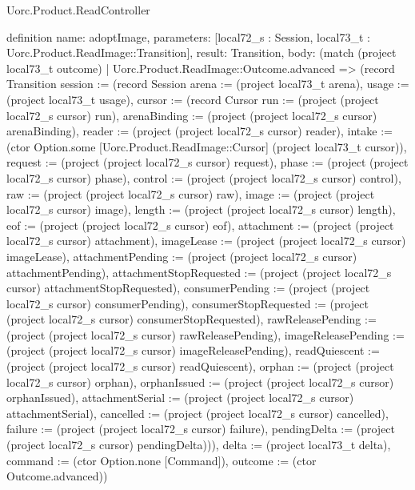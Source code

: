 \begin{lexlean}{Uorc.Product.ReadController}
\begin{semanticmodule}
definition{
  name: adoptImage,
  parameters: [local72_s : Session, local73_t : Uorc.Product.ReadImage::Transition],
  result: Transition,
  body: (match (project local73_t outcome)
    | Uorc.Product.ReadImage::Outcome.advanced => (record Transition {session := (record Session {arena := (project local73_t arena), usage := (project local73_t usage), cursor := (record Cursor {run := (project (project local72_s cursor) run), arenaBinding := (project (project local72_s cursor) arenaBinding), reader := (project (project local72_s cursor) reader), intake := (ctor Option.some [Uorc.Product.ReadImage::Cursor] (project local73_t cursor)), request := (project (project local72_s cursor) request), phase := (project (project local72_s cursor) phase), control := (project (project local72_s cursor) control), raw := (project (project local72_s cursor) raw), image := (project (project local72_s cursor) image), length := (project (project local72_s cursor) length), eof := (project (project local72_s cursor) eof), attachment := (project (project local72_s cursor) attachment), imageLease := (project (project local72_s cursor) imageLease), attachmentPending := (project (project local72_s cursor) attachmentPending), attachmentStopRequested := (project (project local72_s cursor) attachmentStopRequested), consumerPending := (project (project local72_s cursor) consumerPending), consumerStopRequested := (project (project local72_s cursor) consumerStopRequested), rawReleasePending := (project (project local72_s cursor) rawReleasePending), imageReleasePending := (project (project local72_s cursor) imageReleasePending), readQuiescent := (project (project local72_s cursor) readQuiescent), orphan := (project (project local72_s cursor) orphan), orphanIssued := (project (project local72_s cursor) orphanIssued), attachmentSerial := (project (project local72_s cursor) attachmentSerial), cancelled := (project (project local72_s cursor) cancelled), failure := (project (project local72_s cursor) failure), pendingDelta := (project (project local72_s cursor) pendingDelta)})}), delta := (project local73_t delta), command := (ctor Option.none [Command]), outcome := (ctor Outcome.advanced)})
}
\end{semanticmodule}
\end{lexlean}
